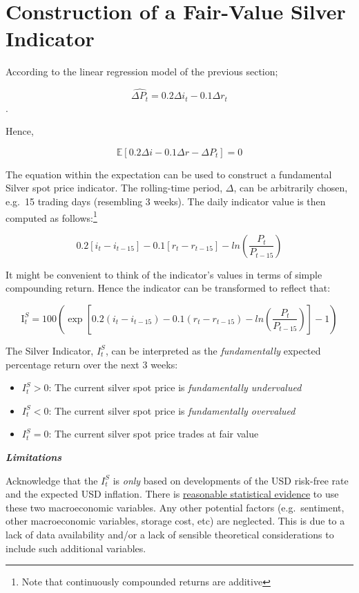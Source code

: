 \documentclass[
  12pt,
]{article}
\providecommand{\tightlist}{%
  \setlength{\itemsep}{0pt}\setlength{\parskip}{0pt}}
\begin{document}
\newpage

\hypertarget{construction-of-a-fair-value-silver-indicator}{%
\section{Construction of a Fair-Value Silver
Indicator}\label{construction-of-a-fair-value-silver-indicator}}

According to the linear regression model of the previous section;

\[\widehat{\Delta P_t} = 0.2 \Delta i_t -0.1 \Delta r_t\].

Hence,

\[\mathbb{E}[0.2 \Delta i - 0.1 \Delta r - \Delta P_t] = 0\]

The equation within the expectation can be used to construct a
fundamental Silver spot price indicator. The rolling-time period,
\(\Delta\), can be arbitrarily chosen, e.g.~15 trading days (resembling
3 weeks). The daily indicator value is then computed as
follows:\footnote{Note that continuously compounded returns are additive}

\[0.2 [i_t-i_{t-15}] - 0.1[r_t - r_{t-15}] - ln \left( \frac{P_t}{P_{t-15}} \right)\]

It might be convenient to think of the indicator's values in terms of
simple compounding return. Hence the indicator can be transformed to
reflect that:

\[\text{I}^S_t=100\left( \exp \left[ 0.2 (i_t-i_{t-15}) - 0.1(r_t - r_{t-15}) - ln \left( \frac{P_t}{P_{t-15}} \right) \right] -1 \right)\]

The Silver Indicator, \(I^S_t\), can be interpreted as the
\emph{fundamentally} expected percentage return over the next 3 weeks:

\begin{itemize}
\tightlist
\item
  \(I^S_t > 0\): The current silver spot price is \emph{fundamentally
  undervalued}
\item
  \(I^S_t < 0\): The current silver spot price is \emph{fundamentally
  overvalued}
\item
  \(I^S_t = 0\): The current silver spot price trades at fair value
\end{itemize}

\vspace{5 mm}

\textbf{\emph{Limitations}}

Acknowledge that the \(I^S_t\) is \emph{only} based on developments of
the USD risk-free rate and the expected USD inflation. There is
\protect\hyperlink{empirical-validation}{reasonable statistical
evidence} to use these two macroeconomic variables. Any other potential
factors (e.g.~sentiment, other macroeconomic variables, storage cost,
etc) are neglected. This is due to a lack of data availability and/or a
lack of sensible theoretical considerations to include such additional
variables.
\end{document}
